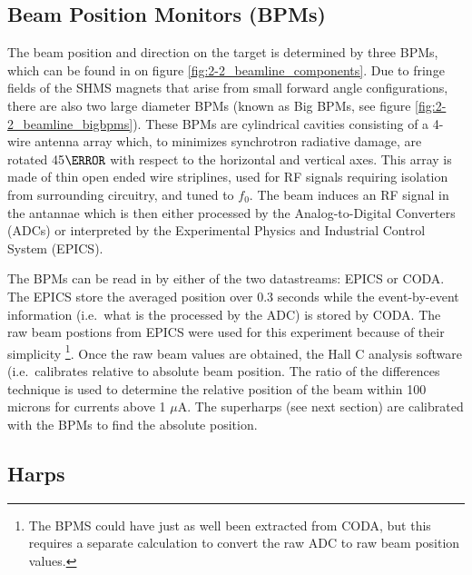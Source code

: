 \documentclass[
]{report}
\begin{document}
\hypertarget{beam-position-monitors-bpms}{%
\subsection{Beam Position Monitors
(BPMs)}\label{beam-position-monitors-bpms}}

The beam position and direction on the target is determined by three
BPMs, which can be found in on figure \ref{fig:2-2_beamline_components}.
Due to fringe fields of the SHMS magnets that arise from small forward
angle configurations, there are also two large diameter BPMs (known as
Big BPMs, see figure \ref{fig:2-2_beamline_bigbpms}). These BPMs are
cylindrical cavities consisting of a 4-wire antenna array which, to
minimizes synchrotron radiative damage, are rotated 45\(\degree\) with
respect to the horizontal and vertical axes. This array is made of thin
open ended wire striplines, used for RF signals requiring isolation from
surrounding circuitry, and tuned to \(f_0\). The beam induces an RF
signal in the antannae which is then either processed by the
Analog-to-Digital Converters (ADCs) or interpreted by the Experimental
Physics and Industrial Control System (EPICS).





The BPMs can be read in by either of the two datastreams: EPICS or CODA.
The EPICS store the averaged position over 0.3 seconds while the
event-by-event information (i.e.~what is the processed by the ADC) is
stored by CODA. The raw beam postions from EPICS were used for this
experiment because of their simplicity
\footnote{The BPMS could have just as well been extracted from CODA, but this requires a separate calculation to convert the raw ADC to raw beam position values.}.
Once the raw beam values are obtained, the Hall C analysis software
(i.e.~calibrates relative to absolute beam position. The ratio of the
differences technique is used to determine the relative position of the
beam within 100 microns for currents above 1 \(\mu\)A. The superharps
(see next section) are calibrated with the BPMs to find the absolute
position.

\hypertarget{harps}{%
\subsection{Harps}\label{harps}}
\end{document}
